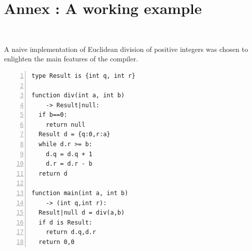 \documentclass[10pt,a4paper]{article}
\renewcommand{\indent}{~\\\vspace{-.8cm}}
\begin{document}
 
 \newpage
 
 
\newpage
\section*{Annex : A working example}\indent
\label{Ex}

A naive implementation of Euclidean division of positive integers was chosen to enlighten the main features of the compiler.

\newbox\wcode
\begin{lrbox}{\wcode}
\begin{minipage}[t]{.45\textwidth}
\begin{lstlisting}[language=Whiley, frame=single, showlines=true, numbers=left]
type Result is {int q, int r}

function div(int a, int b) 
    -> Result|null:
  if b==0:
    return null
  Result d = {q:0,r:a}
  while d.r >= b:
    d.q = d.q + 1
    d.r = d.r - b
  return d

function main(int a, int b) 
    -> (int q,int r):
  Result|null d = div(a,b)
  if d is Result:
    return d.q,d.r
  return 0,0
\end{lstlisting}
\end{minipage}
\end{lrbox}
\end{document}
